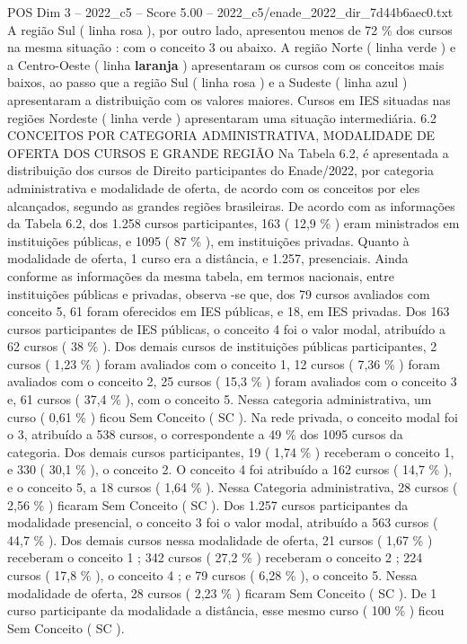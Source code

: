 \begin{textsample}{POS Dim 3 – 2022\_c5 – Score 5.00 – 2022\_c5/enade\_2022\_dir\_7d44b6aec0.txt}
A região Sul ( linha rosa ), por outro lado, apresentou menos de 72 \% dos cursos na mesma situação : com o conceito 3 ou abaixo.
A região Norte ( linha verde ) e a Centro-Oeste ( linha \textbf{laranja} ) apresentaram os cursos com os conceitos mais baixos, ao passo que a região Sul ( linha rosa ) e a Sudeste ( linha azul ) apresentaram a distribuição com os valores maiores.
Cursos em IES situadas nas regiões Nordeste ( linha verde ) apresentaram uma situação intermediária. 6.2 CONCEITOS POR CATEGORIA ADMINISTRATIVA, MODALIDADE DE OFERTA DOS CURSOS E GRANDE REGIÃO Na Tabela 6.2, é apresentada a distribuição dos cursos de Direito participantes do Enade/2022, por categoria administrativa e modalidade de oferta, de acordo com os conceitos por eles alcançados, segundo as grandes regiões brasileiras.
De acordo com as informações da Tabela 6.2, dos 1.258 cursos participantes, 163 ( 12,9 \% ) eram ministrados em instituições públicas, e 1095 ( 87 \% ), em instituições privadas.
Quanto à modalidade de oferta, 1 curso era a distância, e 1.257, presenciais.
Ainda conforme as informações da mesma tabela, em termos nacionais, entre instituições públicas e privadas, observa -se que, dos 79 cursos avaliados com conceito 5, 61 foram oferecidos em IES públicas, e 18, em IES privadas.
Dos 163 cursos participantes de IES públicas, o conceito 4 foi o valor modal, atribuído a 62 cursos ( 38 \% ).
Dos demais cursos de instituições públicas participantes, 2 cursos ( 1,23 \% ) foram avaliados com o conceito 1, 12 cursos ( 7,36 \% ) foram avaliados com o conceito 2, 25 cursos ( 15,3 \% ) foram avaliados com o conceito 3 e, 61 cursos ( 37,4 \% ), com o conceito 5.
Nessa categoria administrativa, um curso ( 0,61 \% ) ficou Sem Conceito ( SC ).
Na rede privada, o conceito modal foi o 3, atribuído a 538 cursos, o correspondente a 49 \% dos 1095 cursos da categoria.
Dos demais cursos participantes, 19 ( 1,74 \% ) receberam o conceito 1, e 330 ( 30,1 \% ), o conceito 2.
O conceito 4 foi atribuído a 162 cursos ( 14,7 \% ), e o conceito 5, a 18 cursos ( 1,64 \% ).
Nessa Categoria administrativa, 28 cursos ( 2,56 \% ) ficaram Sem Conceito ( SC ).
Dos 1.257 cursos participantes da modalidade presencial, o conceito 3 foi o valor modal, atribuído a 563 cursos ( 44,7 \% ).
Dos demais cursos nessa modalidade de oferta, 21 cursos ( 1,67 \% ) receberam o conceito 1 ; 342 cursos ( 27,2 \% ) receberam o conceito 2 ; 224 cursos ( 17,8 \% ), o conceito 4 ; e 79 cursos ( 6,28 \% ), o conceito 5.
Nessa modalidade de oferta, 28 cursos ( 2,23 \% ) ficaram Sem Conceito ( SC ).
De 1 curso participante da modalidade a distância, esse mesmo curso ( 100 \% ) ficou Sem Conceito ( SC ).

\end{textsample}
